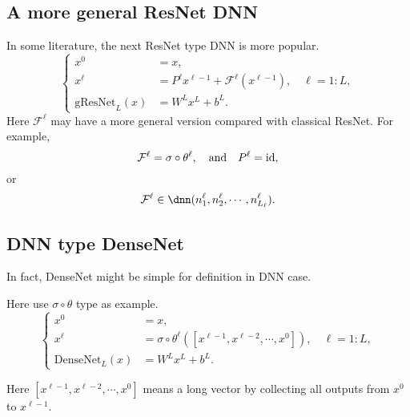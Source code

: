\subsection{A more general ResNet DNN}
In some literature, the next ResNet type DNN is more popular.
\begin{equation}\label{general-ResNet-dnn}
\begin{cases}
x^0 &= x, \\
x^{\ell} &=  P^\ell x^{\ell-1} + \mathcal{F}^{\ell} \left( x^{\ell-1} \right), \quad \ell = 1:L ,\\
{\text{gResNet}}_{L}(x) &=  W^L x^{L} + b^L.
\end{cases}
\end{equation}
Here $\mathcal{F}^{\ell}$ may have a more general version compared with classical ResNet.
For example, 
\begin{equation}\label{key}
\mathcal{F}^{\ell} = \sigma \circ \theta^\ell, \quad \text{and} \quad P^\ell = {\rm id},
\end{equation}
or
\begin{equation}\label{key}
\mathcal{F}^{\ell} \in \dnn(n^\ell_1, n^\ell_2, \cdots, n^\ell_{L_\ell}).
\end{equation}


\subsection{DNN type DenseNet}
In fact, DenseNet might be simple for definition in DNN case. 

Here use $\sigma \circ \theta$ type as example.
\begin{equation}\label{ori-DenseNet-dnn}
\begin{cases}
x^0 &= x, \\
x^{\ell} &=   \sigma \circ \theta^{\ell}([x^{\ell-1}, x^{\ell-2}, \cdots, x^0]) , \quad \ell = 1:L ,\\
{\text{DenseNet}}_{L}(x) &=  W^L x^{L} + b^L.
\end{cases}
\end{equation}

Here $[x^{\ell-1}, x^{\ell-2}, \cdots, x^0]$ means a long vector by collecting all 
outputs from $x^0$ to $x^{\ell-1}$.



